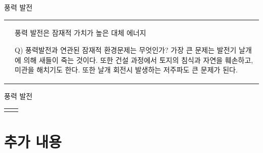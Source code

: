 \begin{frame}[t]{풍력 발전}
	\begin{tabular}{ll}
		\begin{minipage}[t]{0.4\textwidth}\scriptsize
			
			
		\end{minipage}	
		&
		\begin{minipage}[t]{0.55\textwidth} \scriptsize	
			
			풍력 발전은 잠재적 가치가 높은 대체 에너지
			
			Q) 풍력발전과 연관된 잠재적 환경문제는 무엇인가?
			가장 큰 문제는 발전기 날개에 의해 새들이 죽는 것이다. 또한 건설 과정에서 토지의 침식과 자연을 훼손하고, 미관을 해치기도 한다. 
			또한 날개 회전시 발생하는 저주파도 큰 문제가 된다. 
			
			
			
		\end{minipage}
	\end{tabular}
\end{frame}


\begin{frame}[t]{풍력 발전}
	\begin{tabular}{ll}
		\begin{minipage}[t]{0.4\textwidth}\scriptsize
			
			
		\end{minipage}	
		&
		\begin{minipage}[t]{0.55\textwidth} \scriptsize	
			
		
			
			
			
		\end{minipage}
	\end{tabular}
\end{frame}



\section{추가 내용}




